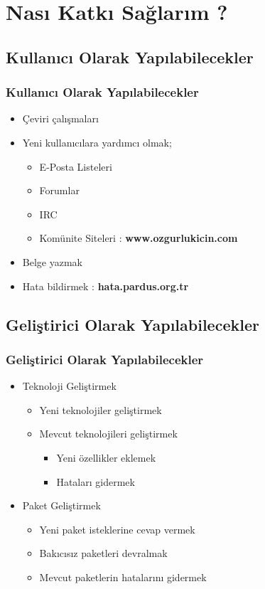 \documentclass{beamer}
\begin{document}
\section{Nası Katkı Sağlarım ?}

\subsection{Kullanıcı Olarak Yapılabilecekler}
\frame
{
    \frametitle{Kullanıcı Olarak Yapılabilecekler}
	\begin{itemize}
        \item Çeviri çalışmaları
        \item Yeni kullanıcılara yardımcı olmak;
        \begin{itemize}
            \item E-Posta Listeleri
            \item Forumlar
            \item IRC
            \item Komünite Siteleri : \textbf{www.ozgurlukicin.com}
        \end{itemize}
        \item Belge yazmak
        \item Hata bildirmek : \textbf{hata.pardus.org.tr}
	\end{itemize}
}

\subsection{Geliştirici Olarak Yapılabilecekler}
\frame
{
    \frametitle{Geliştirici Olarak Yapılabilecekler}
	\begin{itemize}
        \item Teknoloji Geliştirmek
        \begin{itemize}
            \item Yeni teknolojiler geliştirmek
            \item Mevcut teknolojileri geliştirmek
            \begin{itemize}
                \item Yeni özellikler eklemek
                \item Hataları gidermek
            \end{itemize}
        \end{itemize}
        \item Paket Geliştirmek
        \begin{itemize}
            \item Yeni paket isteklerine cevap vermek
            \item Bakıcısız paketleri devralmak
            \item Mevcut paketlerin hatalarını gidermek
        \end{itemize}
	\end{itemize}
}
\end{document}
